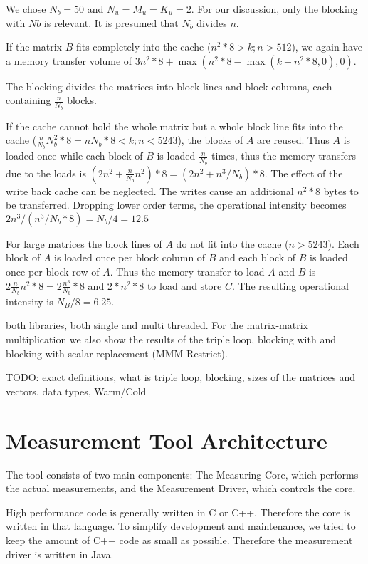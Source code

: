 \documentclass[a4paper,12pt]{article}
\begin{document}
We chose $N_b=50$ and $N_u=M_u=K_u=2$.
For our discussion, only the blocking with $Nb$ is relevant. It is presumed that
$N_b$ divides $n$. 

If the matrix $B$ fits completely into the cache ($n^2*8>k;n>512$), we again
have a memory transfer volume of $3n^2*8+\max(n^2*8-\max(k-n^2*8,0),0)$. 

The blocking divides the matrices into block lines and block columns, each
containing $\frac{n}{N_b}$ blocks.

If the cache cannot hold the whole matrix but a whole block line fits
into the cache ($\frac{n}{N_b}N_b^2*8=nN_b*8<k;n<5243$), the blocks of $A$ are
reused.
Thus $A$ is loaded once while each block of $B$ is loaded $\frac{n}{N_b}$ times,
thus the memory transfers due to the loads is
$(2n^2+\frac{n}{N_b}n^2)*8=(2n^2+n^3/N_b)*8$. The effect of the write back cache
can be neglected. The writes cause an additional $n^2*8$ bytes to be
transferred. Dropping lower order terms, the operational intensity becomes
$2n^3/(n^3/N_b*8)=N_b/4=12.5$

For large matrices the block lines of $A$ do not fit into the cache ($n>5243$).
Each block of $A$ is loaded once per block column of $B$ and each block of $B$ is loaded
once per block row of $A$. Thus the memory transfer to load $A$ and $B$ is
$2\frac{n}{N_b}n^2*8=2\frac{n^3}{N_b}*8$ and $2*n^2*8$ to load and store $C$.
The resulting operational intensity is $N_B/8=6.25$.


both libraries, both single and multi threaded. For the matrix-matrix
multiplication we also show the results of the triple loop, blocking with
 and blocking with scalar replacement (MMM-Restrict).

TODO: exact definitions, what is triple loop, blocking, sizes of the matrices
and vectors, data types, Warm/Cold




\clearpage
\section{Measurement Tool Architecture}
The tool consists of two main components: The Measuring Core, which performs the
actual measurements, and the Measurement Driver, which controls the core.

High performance code is generally written in C or C++. Therefore the core is
written in that language. To simplify development and maintenance, we tried to
keep the amount of C++ code as small as possible. Therefore the measurement
driver is written in Java.
\end{document}
